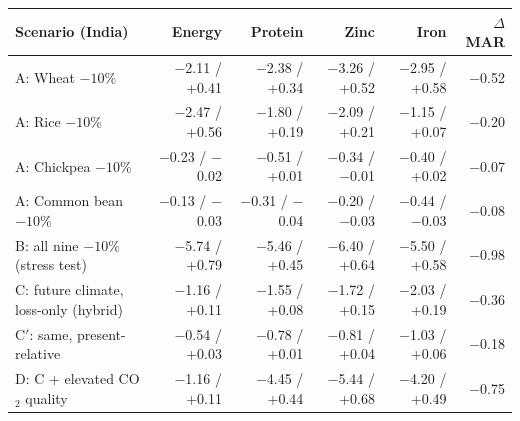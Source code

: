 \begin{tabular}{@{}lrrrrr@{}}
\toprule
Scenario (India) & Energy & Protein & Zinc & Iron & $\Delta$MAR \\
\midrule
A: Wheat $-10\%$ & $-$2.11 / +0.41 & $-$2.38 / +0.34 & $-$3.26 / +0.52 & $-$2.95 / +0.58 & $-$0.52 \\
A: Rice $-10\%$ & $-$2.47 / +0.56 & $-$1.80 / +0.19 & $-$2.09 / +0.21 & $-$1.15 / +0.07 & $-$0.20 \\
A: Chickpea $-10\%$ & $-$0.23 / $-$0.02 & $-$0.51 / +0.01 & $-$0.34 / $-$0.01 & $-$0.40 / +0.02 & $-$0.07 \\
A: Common bean $-10\%$ & $-$0.13 / $-$0.03 & $-$0.31 / $-$0.04 & $-$0.20 / $-$0.03 & $-$0.44 / $-$0.03 & $-$0.08 \\
B: all nine $-10\%$ (stress test) & $-$5.74 / +0.79 & $-$5.46 / +0.45 & $-$6.40 / +0.64 & $-$5.50 / +0.58 & $-$0.98 \\
C: future climate, loss-only (hybrid) & $-$1.16 / +0.11 & $-$1.55 / +0.08 & $-$1.72 / +0.15 & $-$2.03 / +0.19 & $-$0.36 \\
C$'$: same, present-relative & $-$0.54 / +0.03 & $-$0.78 / +0.01 & $-$0.81 / +0.04 & $-$1.03 / +0.06 & $-$0.18 \\
D: C + elevated CO$_2$ quality & $-$1.16 / +0.11 & $-$4.45 / +0.44 & $-$5.44 / +0.68 & $-$4.20 / +0.49 & $-$0.75 \\
\bottomrule
\end{tabular}
